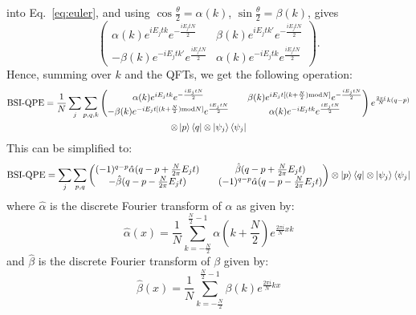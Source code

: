 into Eq.~\eqref{eq:euler}, and using $\cos\frac{\theta}{2}=\alpha(k)$, $\sin\frac{\theta}{2}=\beta(k)$, gives
\begin{equation}
\begin{pmatrix}
\alpha(k)e^{iE_jtk}e^{-\frac{iE_jtN}{2}} & \beta(k)e^{iE_jt k'}e^{-\frac{iE_jtN}{2}}\\
-\beta(k)e^{-iE_jt k'}e^{\frac{iE_jtN}{2}} & \alpha(k)e^{-iE_jtk}e^{\frac{iE_jtN}{2}}
\end{pmatrix}.
\end{equation}
Hence, summing over $k$ and the QFTs, we get the following operation:
\begin{multline}
        \text{BSI-QPE} = \frac{1}{N}\sum_j\sum_{p,q,k} \begin{pmatrix}
        \alpha(k)e^{iE_jtk}e^{-\frac{iE_jtN}{2}} && \beta(k)e^{iE_jt[(k+\frac{N}{2})\text{mod} N]}e^{-\frac{iE_jtN}{2}}\\
        -\beta (k)e^{-iE_jt[(k+\frac{N}{2})\text{mod} N]}e^{\frac{iE_jtN}{2}} && \alpha(k)e^{-iE_jtk}e^{\frac{iE_jtN}{2}}
    \end{pmatrix}e^{\frac{2\pi i}{N}k(q-p)} \\\otimes\ket{p}\bra{q}\otimes\ket{\psi_j}\bra{\psi_j}
\end{multline}
This can be simplified to:
\begin{equation}
    \text{BSI-QPE} = \sum_j\sum_{p,q} \begin{pmatrix}
        (-1)^{q-p}\hat\alpha(q-p+\frac{N}{2\pi}E_jt) && \hat\beta(q-p+\frac{N}{2\pi}E_jt)\\
        -\hat\beta (q-p-\frac{N}{2\pi}E_jt) && (-1)^{q-p}\hat\alpha(q-p-\frac{N}{2\pi}E_jt)
    \end{pmatrix}\otimes\ket{p}\bra{q}\otimes\ket{\psi_j}\bra{\psi_j}
\end{equation}
where $\hat \alpha$ is the discrete Fourier transform of $\alpha$ as given by:
\begin{equation}
   \hat\alpha(x) =\frac{1}{N}\sum_{k=-\frac{N}{2}}^{\frac{N}{2}-1} \alpha(k+\frac{N}{2})e^{\frac{2\pi i}{N}xk}
\end{equation}
and $\hat \beta$ is the discrete Fourier transform of $\beta$ given by:
\begin{equation}
    \hat\beta(x) =\frac{1}{N}\sum_{k=-\frac{N}{2}}^{\frac{N}{2}-1} \beta(k)e^{\frac{2\pi i}{N}kx}
\end{equation}
